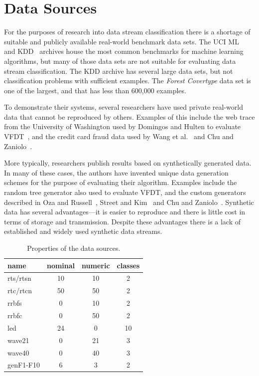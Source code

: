 \section{Data Sources}
\label{sec:datasets}

For the purposes of research into data stream classification there is a shortage of suitable and publicly available real-world benchmark data sets. The UCI ML~\cite{uci} and KDD~\cite{ucikdd} archives house the most common benchmarks for machine learning algorithms, but many of those data sets are not suitable for evaluating data stream classification. The KDD archive has several large data sets, but not classification problems with sufficient examples. The {\em Forest Covertype} data set is one of the largest, and that has less than 600,000 examples.

To demonstrate their systems, several researchers have used private real-world data that cannot be reproduced by others. Examples of this include the web trace from the University of Washington used by Domingos and Hulten to evaluate VFDT~\cite{vfdt}, and the credit card fraud data used by Wang et al.~\cite{cdensemble} and Chu and Zaniolo~\cite{fastlightboost}.

More typically, researchers publish results based on synthetically generated data.
In many of these cases, the authors have invented unique data generation schemes for the purpose of evaluating their algorithm.
Examples include the random tree generator also used to evaluate VFDT, and the custom generators described in Oza and Russell~\cite{ozaexp}, Street and Kim~\cite{sea} and Chu and Zaniolo~\cite{fastlightboost}.
Synthetic data has several advantages---it is easier to reproduce and there is little cost in terms of storage and transmission.
Despite these advantages there is a lack of established and widely used synthetic data streams. 

\begin{table}
\caption{Properties of the data sources.}
\centering
\begin{tabular}{|l|c|c|c|}
\hline
name     &    nominal    &    numeric    &    classes    \\
\hline
{\sc rts/rtsn}    &    10    &    10    &    2    \\
{\sc rtc/rtcn}    &    50    &    50    &    2    \\
{\sc rrbfs}    &    0    &    10    &    2    \\
{\sc rrbfc}    &    0    &    50    &    2    \\
{\sc led}    &    24    &    0    &    10    \\
{\sc wave21}    &    0    &    21    &    3    \\
{\sc wave40}    &    0    &    40    &    3    \\
{\sc genF1-F10}    &    6    &    3    &    2    \\
\hline
\end{tabular}
\label{tab:datasets}
\end{table}

